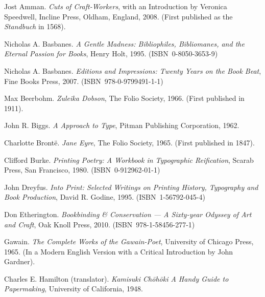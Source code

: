 \documentclass{memoir}
\newcommand*{\isbn}{{\small\textsc{ISBN}}}
\begin{document}

\begin{thebibliography}{RCHM99}

  Jost Amman.
  \newblock \emph{Cuts of Craft-Workers},
  with an Introduction by Veronica Speedwell,
  \newblock Incline Press, Oldham, England, 2008.
  \newblock (First published as the \emph{Standbuch} in 1568).

  Nicholas A. Basbanes.
  \newblock \emph{A Gentle Madness: Bibliophiles, Bibliomanes, and the Eternal
    Passion for Books},
  \newblock Henry Holt, 1995. (\isbn\ 0-8050-3653-9)

  Nicholas A. Basbanes.
  \newblock \emph{Editions and Impressions: Twenty Years on the Book Beat},
  \newblock Fine Books Press, 2007. (\isbn\ 978-0-9799491-1-1)

  Max Beerbohm.
  \newblock \emph{Zuleika Dobson},
  \newblock The Folio Society, 1966.
  \newblock (First published in 1911).

  John R. Biggs.
  \newblock \emph{A Approach to Type},
  \newblock Pitman Publishing Corporation, 1962.


  Charlotte Bront\"{e}.
  \newblock \emph{Jane Eyre},
  \newblock The Folio Society, 1965.
  \newblock (First published in 1847).

  Clifford Burke.
  \newblock \emph{Printing Poetry: A Workbook in Typographic Reification},
  \newblock Scarab Press, San Francisco, 1980. (\isbn\ 0-912962-01-1)

  John Dreyfus.
  \newblock \emph{Into Print: Selected Writings on Printing History, Typography
    and Book Production},
  \newblock David R. Godine, 1995. (\isbn\ 1-56792-045-4)

  Don Etherington.
  \newblock \emph{Bookbinding \& Conservation --- A Sixty-year Odyssey
    of Art and Craft},
  \newblock Oak Knoll Press, 2010. (\isbn\ 978-1-58456-277-1)

  Gawain.
  \newblock \emph{The Complete Works of the Gawain-Poet},
  \newblock University of Chicago Press, 1965.
  \newblock(In a Modern English Version with a Critical Introduction
  by John Gardner).

  Charles E. Hamilton (translator).
  \newblock \emph{Kamisuki Ch\={o}h\={o}ki A Handy Guide to Papermaking},
  \newblock University of California, 1948.


\end{thebibliography}
\end{document}
